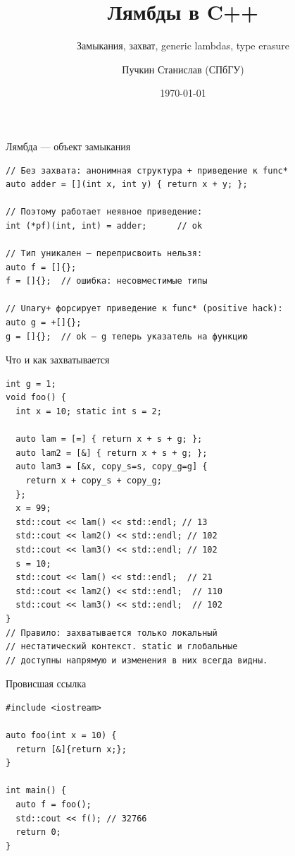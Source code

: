 \documentclass{beamer}
\author{Пучкин Станислав (СПбГУ)}
\title{Лямбды в C++}
\subtitle{Замыкания, захват, generic lambdas, type erasure}
\institute{C++ Семинар}
\date{\today}
\begin{document}
\begin{frame}
    \titlepage
\end{frame}

\begin{frame}[fragile]{Лямбда — объект замыкания}
\begin{lstlisting}
// Без захвата: анонимная структура + приведение к func*
auto adder = [](int x, int y) { return x + y; };

// Поэтому работает неявное приведение:
int (*pf)(int, int) = adder;      // ok

// Тип уникален — переприсвоить нельзя:
auto f = []{};
f = []{};  // ошибка: несовместимые типы

// Unary+ форсирует приведение к func* (positive hack):
auto g = +[]{};
g = []{};  // ok — g теперь указатель на функцию
\end{lstlisting}
\end{frame}

\begin{frame}[fragile]{Что и как захватывается}
\begin{lstlisting}
int g = 1;
void foo() {
  int x = 10; static int s = 2;

  auto lam = [=] { return x + s + g; };
  auto lam2 = [&] { return x + s + g; };
  auto lam3 = [&x, copy_s=s, copy_g=g] {
    return x + copy_s + copy_g;
  };
  x = 99;
  std::cout << lam() << std::endl; // 13
  std::cout << lam2() << std::endl; // 102
  std::cout << lam3() << std::endl; // 102
  s = 10;
  std::cout << lam() << std::endl;  // 21
  std::cout << lam2() << std::endl;  // 110
  std::cout << lam3() << std::endl;  // 102
}
// Правило: захватывается только локальный
// нестатический контекст. static и глобальные
// доступны напрямую и изменения в них всегда видны.
\end{lstlisting}
\end{frame}

\begin{frame}[fragile]{Провисшая ссылка}
\begin{lstlisting}
#include <iostream>

auto foo(int x = 10) {
  return [&]{return x;};
}

int main() {
  auto f = foo();
  std::cout << f(); // 32766
  return 0;
}
\end{lstlisting}
\end{frame}
\end{document}
